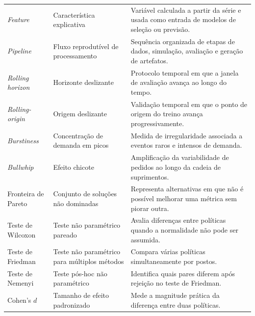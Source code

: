 \begin{longtable}{@{}>{\raggedright\arraybackslash}p{2.35cm}>{\raggedright\arraybackslash}p{5.05cm}>{\raggedright\arraybackslash}p{7.15cm}@{}}
\textit{Feature} & Característica explicativa & Variável calculada a partir da série e usada como entrada de modelos de seleção ou previsão. \\
\textit{Pipeline} & Fluxo reprodutível de processamento & Sequência organizada de etapas de dados, simulação, avaliação e geração de artefatos. \\
\textit{Rolling horizon} & Horizonte deslizante & Protocolo temporal em que a janela de avaliação avança ao longo do tempo. \\
\textit{Rolling-origin} & Origem deslizante & Validação temporal em que o ponto de origem do treino avança progressivamente. \\
\textit{Burstiness} & Concentração de demanda em picos & Medida de irregularidade associada a eventos raros e intensos de demanda. \\
\textit{Bullwhip} & Efeito chicote & Amplificação da variabilidade de pedidos ao longo da cadeia de suprimentos. \\
Fronteira de Pareto & Conjunto de soluções não dominadas & Representa alternativas em que não é possível melhorar uma métrica sem piorar outra. \\
Teste de Wilcoxon & Teste não paramétrico pareado & Avalia diferenças entre políticas quando a normalidade não pode ser assumida. \\
Teste de Friedman & Teste não paramétrico para múltiplos métodos & Compara várias políticas simultaneamente por postos. \\
Teste de Nemenyi & Teste pós-hoc não paramétrico & Identifica quais pares diferem após rejeição no teste de Friedman. \\
Cohen's $d$ & Tamanho de efeito padronizado & Mede a magnitude prática da diferença entre duas políticas. \\
\bottomrule
\end{longtable}
\endgroup

\newpage
\lhead{\rightmark}
